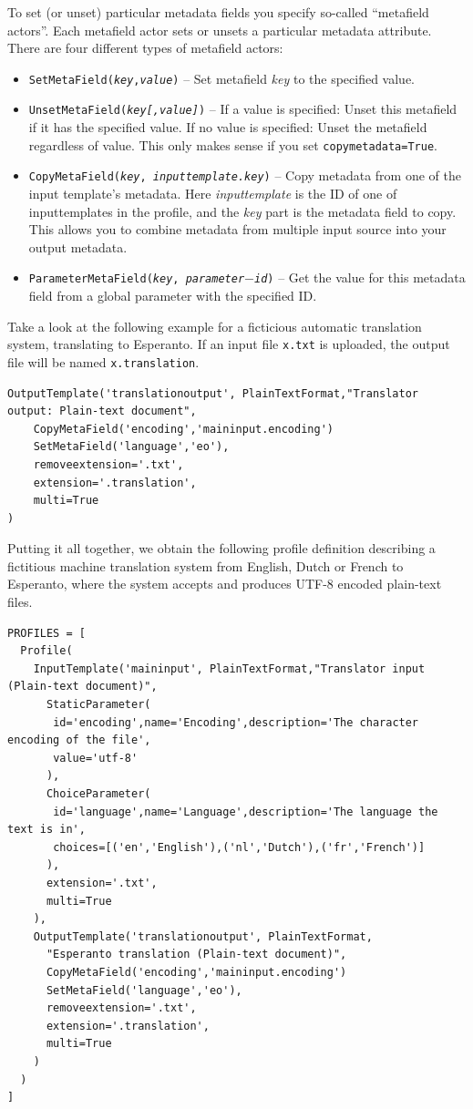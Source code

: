 \documentclass[a4paper,12pt]{report}
\begin{document}
To set (or unset) particular metadata fields you specify so-called ``metafield
actors''. Each metafield actor sets or unsets a particular metadata attribute.
There are four different types of metafield actors:

\begin{itemize}
\item \texttt{SetMetaField(\emph{key},\emph{value})} -- Set metafield \emph{key} to the specified value.
\item \texttt{UnsetMetaField(\emph{key}\emph{[,value]})} -- If a value is specified: Unset this metafield if it has the specified value. If no value is specified: Unset the metafield regardless of value. This only makes sense if you set \texttt{copymetadata=True}.
\item \texttt{CopyMetaField(\emph{key}, \emph{inputtemplate.key})} -- Copy metadata from one of the input template's metadata. Here \emph{inputtemplate} is the ID of one of inputtemplates in the profile, and the \emph{key} part is the metadata field to copy. This allows you to combine metadata from multiple input source into your output metadata.
\item \texttt{ParameterMetaField(\emph{key}, \emph{parameter$-$id})} -- Get the value for this metadata field from a global parameter with the specified ID.
\end{itemize}

Take a look at the following example for a ficticious automatic translation
system, translating to Esperanto. If an input file \texttt{x.txt} is uploaded,
the output file will be named \texttt{x.translation}.

{\footnotesize{
\begin{verbatim}
OutputTemplate('translationoutput', PlainTextFormat,"Translator output: Plain-text document",  
    CopyMetaField('encoding','maininput.encoding')
    SetMetaField('language','eo'),
    removeextension='.txt',
    extension='.translation',
    multi=True
)
\end{verbatim}
}}

Putting it all together, we obtain the following profile definition describing
a fictitious machine translation system from English, Dutch or French to
Esperanto, where the system accepts and produces UTF-8 encoded plain-text
files.

{\footnotesize{
\begin{verbatim}
PROFILES = [ 
  Profile( 
    InputTemplate('maininput', PlainTextFormat,"Translator input (Plain-text document)",  
      StaticParameter(
       id='encoding',name='Encoding',description='The character encoding of the file', 
       value='utf-8'
      ),  
      ChoiceParameter(
       id='language',name='Language',description='The language the text is in', 
       choices=[('en','English'),('nl','Dutch'),('fr','French')]
      ),
      extension='.txt',
      multi=True
    ), 
    OutputTemplate('translationoutput', PlainTextFormat,
      "Esperanto translation (Plain-text document)",  
      CopyMetaField('encoding','maininput.encoding')
      SetMetaField('language','eo'),
      removeextension='.txt',
      extension='.translation',
      multi=True
    )    
  )
]
\end{verbatim}
}}
\end{document}

